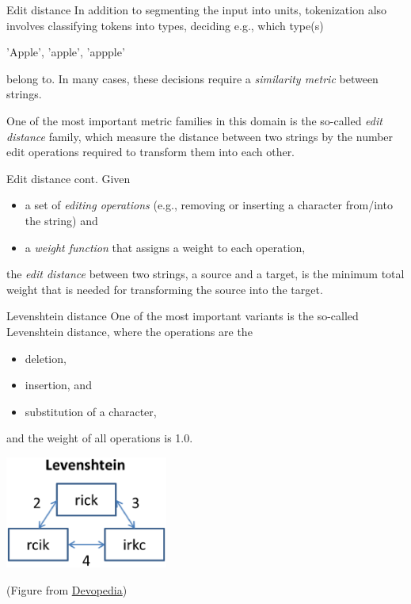 \documentclass[style=upen, size=14pt]{powerdot}
\newcommand{\gold}{\color{arany}}
\theoremstyle{definition}
\begin{document}
\begin{slide}[toc=Edit distance]{Edit distance}
  In addition to segmenting the input into units, tokenization also involves
  classifying tokens into types, deciding e.g., which type(s)\smallskip
  \begin{center}
    'Apple', 'apple', 'appple'\smallskip
  \end{center}
  belong to. In many cases, these decisions require a \emph{similarity metric}
  between strings.

  One of the most important metric families in this domain is the so-called
  \emph{\gold edit distance} family, which measure the distance between two
  strings by the number edit operations required to transform them into each
  other.
\end{slide}

\begin{slide}[toc=]{Edit distance cont.}
  Given
  \begin{itemize}
  \item a set of \emph{\gold editing operations} (e.g., removing or inserting a character
    from/into the string) and
  \item a \emph{\gold weight function} that assigns a weight to each operation,
  \end{itemize}
  the \emph{\gold edit distance} between two strings, a source and a target, is
  the minimum total weight that is needed for transforming the source into the
  target.
\end{slide}
    
\begin{slide}[toc=]{Levenshtein distance}
  One of the most important variants is the so-called Levenshtein distance,
  where the operations are the
   \begin{itemize}
  \item deletion,
  \item insertion, and
  \item substitution of a character,
  \end{itemize}
  and the weight of all operations is 1.0.
  \begin{center}
    \includegraphics[width=0.4\textwidth]{figures/levenshtein.eps}\
    
    \footnotesize{(Figure from \href{https://devopedia.org/levenshtein-distance}{Devopedia})}
  \end{center}
\end{slide}
\end{document}

